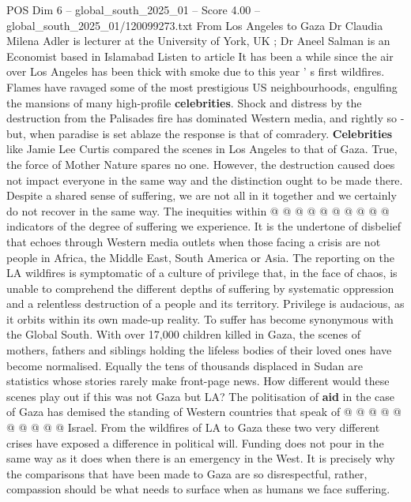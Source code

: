 \begin{textsample}{POS Dim 6 – global\_south\_2025\_01 – Score 4.00 – global\_south\_2025\_01/120099273.txt}  \label{ex:f6_pos_359}
From Los Angeles to Gaza Dr Claudia Milena Adler is lecturer at the University of York, UK ; Dr Aneel Salman is an Economist based in Islamabad Listen to article It has been a while since the air over Los Angeles has been thick with smoke due to this year ' s first wildfires.
Flames have ravaged some of the most prestigious US neighbourhoods, engulfing the mansions of many high-profile \textbf{celebrities}.
Shock and distress by the destruction from the Palisades fire has dominated Western media, and rightly so - but, when paradise is set ablaze the response is that of comradery. \textbf{Celebrities} like Jamie Lee Curtis compared the scenes in Los Angeles to that of Gaza.
True, the force of Mother Nature spares no one.
However, the destruction caused does not impact everyone in the same way and the distinction ought to be made there.
Despite a shared sense of suffering, we are not all in it together and we certainly do not recover in the same way.
The inequities within @ @ @ @ @ @ @ @ @ @ indicators of the degree of suffering we experience.
It is the undertone of disbelief that echoes through Western media outlets when those facing a crisis are not people in Africa, the Middle East, South America or Asia.
The reporting on the LA wildfires is symptomatic of a culture of privilege that, in the face of chaos, is unable to comprehend the different depths of suffering by systematic oppression and a relentless destruction of a people and its territory.
Privilege is audacious, as it orbits within its own made-up reality.
To suffer has become synonymous with the Global South.
With over 17,000 children killed in Gaza, the scenes of mothers, fathers and siblings holding the lifeless bodies of their loved ones have become normalised.
Equally the tens of thousands displaced in Sudan are statistics whose stories rarely make front-page news.
How different would these scenes play out if this was not Gaza but LA?
The politisation of \textbf{aid} in the case of Gaza has demised the standing of Western countries that speak of @ @ @ @ @ @ @ @ @ @ Israel.
From the wildfires of LA to Gaza these two very different crises have exposed a difference in political will.
Funding does not pour in the same way as it does when there is an emergency in the West.
It is precisely why the comparisons that have been made to Gaza are so disrespectful, rather, compassion should be what needs to surface when as humans we face suffering.

\end{textsample}
